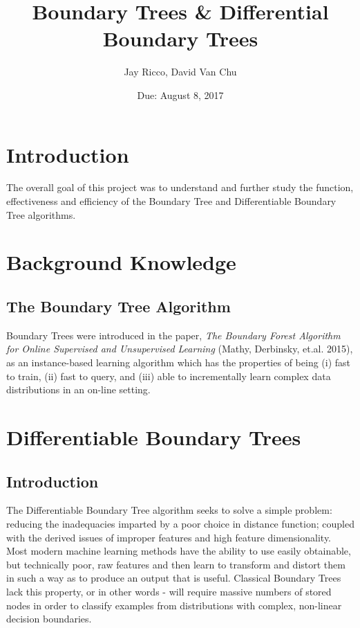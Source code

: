 \documentclass[10pt,letterpaper,twocolumn]{article}
\author{Jay Ricco, David Van Chu}
\title{Boundary Trees \& Differential Boundary Trees}
\date{Due: August 8, 2017}
\begin{document}
	\maketitle
	\section{Introduction}
		The overall goal of this project was to understand and further study the function, effectiveness and efficiency of the Boundary Tree and Differentiable Boundary Tree algorithms. 
	\section{Background Knowledge}
		
		\subsection{The Boundary Tree Algorithm}
		Boundary Trees were introduced in the paper, \textit{The Boundary Forest Algorithm for Online Supervised and Unsupervised Learning }{\footnotesize (Mathy, Derbinsky, et.al. 2015)}, as an instance-based learning algorithm which has the properties of being (i) fast to train, (ii) fast to query, and (iii) able to incrementally learn complex data distributions in an on-line setting.\\
		
		

	\section{Differentiable Boundary Trees}
		\subsection{Introduction}
			The Differentiable Boundary Tree algorithm seeks to solve a simple problem: reducing the inadequacies imparted by a poor choice in distance function; coupled with the derived issues of improper features and high feature dimensionality. Most modern machine learning methods have the ability to use easily obtainable, but technically poor, raw features and then learn to transform and distort them in such a way as to produce an output that is useful. Classical Boundary Trees lack this property, or in other words - will require massive numbers of stored nodes in order to classify examples from  distributions with complex, non-linear decision boundaries.
\end{document}
